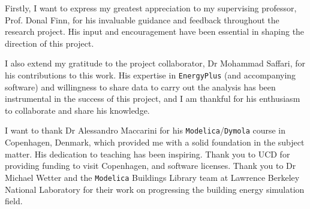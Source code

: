 


\bigskip

\begingroup
\let\clearpage\relax
\let\cleardoublepage\relax
\let\cleardoublepage\relax
{}
Firstly, I want to express my greatest appreciation to my supervising professor, Prof. Donal Finn, for his invaluable guidance and feedback throughout the research project. His input and encouragement have been essential in shaping the direction of this project.

I also extend my gratitude to the project collaborator, Dr Mohammad Saffari, for his contributions to this work. His expertise in \texttt{EnergyPlus} (and accompanying software) and willingness to share data to carry out the analysis has been instrumental in the success of this project, and I am thankful for his enthusiasm to collaborate and share his knowledge.

I want to thank Dr Alessandro Maccarini for his \texttt{Modelica}/\texttt{Dymola} course in Copenhagen, Denmark, which provided me with a solid foundation in the subject matter. His dedication to teaching has been inspiring. Thank you to UCD for providing funding to visit Copenhagen, and software licenses. Thank you to Dr Michael Wetter and the \texttt{Modelica} Buildings Library team at Lawrence Berkeley National Laboratory for their work on progressing the building energy simulation field. 


